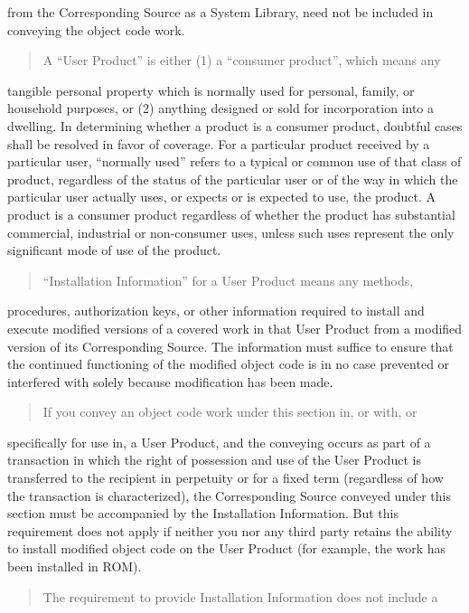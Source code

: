 \documentclass[letterpaper,10pt,english]{sphinxmanual}
\begin{document}
from the Corresponding Source as a System Library, need not be
included in conveying the object code work.
\begin{quote}

A “User Product” is either (1) a “consumer product”, which means any
\end{quote}

tangible personal property which is normally used for personal, family,
or household purposes, or (2) anything designed or sold for incorporation
into a dwelling.  In determining whether a product is a consumer product,
doubtful cases shall be resolved in favor of coverage.  For a particular
product received by a particular user, “normally used” refers to a
typical or common use of that class of product, regardless of the status
of the particular user or of the way in which the particular user
actually uses, or expects or is expected to use, the product.  A product
is a consumer product regardless of whether the product has substantial
commercial, industrial or non-consumer uses, unless such uses represent
the only significant mode of use of the product.
\begin{quote}

“Installation Information” for a User Product means any methods,
\end{quote}

procedures, authorization keys, or other information required to install
and execute modified versions of a covered work in that User Product from
a modified version of its Corresponding Source.  The information must
suffice to ensure that the continued functioning of the modified object
code is in no case prevented or interfered with solely because
modification has been made.
\begin{quote}

If you convey an object code work under this section in, or with, or
\end{quote}

specifically for use in, a User Product, and the conveying occurs as
part of a transaction in which the right of possession and use of the
User Product is transferred to the recipient in perpetuity or for a
fixed term (regardless of how the transaction is characterized), the
Corresponding Source conveyed under this section must be accompanied
by the Installation Information.  But this requirement does not apply
if neither you nor any third party retains the ability to install
modified object code on the User Product (for example, the work has
been installed in ROM).
\begin{quote}

The requirement to provide Installation Information does not include a
\end{quote}
\end{document}
